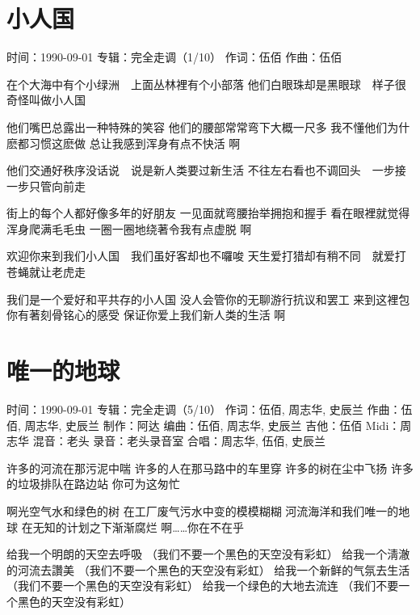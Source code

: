 \documentclass[UTF8,a4paper,oneside,twocolumn,12pt]{ctexbook}
\newcommand{\infopair}[2]{\textbullet #1：#2}
\newcommand{\zc}[1][伍佰]{\infopair{作词}{#1}}
\newcommand{\zq}[1][伍佰]{\infopair{作曲}{#1}}
\newcommand{\bq}[1][伍佰]{\infopair{编曲}{#1}}
\newcommand{\zj}[1]{\infopair{专辑}{#1}}
\newcommand{\zz}[1]{\infopair{制作}{#1}}
\newcommand{\sj}[1]{\infopair{时间}{#1}}
\newenvironment{info}{\begin{flushleft}\kaishu
	}
	{\end{flushleft}\normalsize\yahei\par}
\newenvironment{lyric}{
	}
{}
\begin{document}
\section{小人国}
\begin{info}
	\sj{1990-09-01}
	\zj{完全走调（1/10）}
	\zc
	\zq
\end{info}
\begin{lyric}
	在个大海中有个小绿洲　上面丛林裡有个小部落
	他们白眼珠却是黑眼球　样子很奇怪叫做小人国

	他们嘴巴总露出一种特殊的笑容
	他们的腰部常常弯下大概一尺多
	我不懂他们为什麽都习惯这麽做
	总让我感到浑身有点不快活 啊

	他们交通好秩序没话说　说是新人类要过新生活
	不往左右看也不调回头　一步接一步只管向前走

	街上的每个人都好像多年的好朋友
	一见面就弯腰抬举拥抱和握手
	看在眼裡就觉得浑身爬满毛毛虫
	一圈一圈地绕著令我有点虚脱 啊

	欢迎你来到我们小人国　我们虽好客却也不囉唆
	天生爱打猎却有稍不同　就爱打苍蝇就让老虎走

	我们是一个爱好和平共存的小人国
	没人会管你的无聊游行抗议和罢工
	来到这裡包你有著刻骨铭心的感受
	保证你爱上我们新人类的生活 啊
\end{lyric}

\section{唯一的地球}
\begin{info}
	\sj{1990-09-01}
	\zj{完全走调（5/10）}
	\zc[伍佰, 周志华, 史辰兰]
	\zq[伍佰, 周志华, 史辰兰]
	\zz{阿达}
	\bq[伍佰, 周志华, 史辰兰]
	\infopair{吉他}{伍佰}
	\infopair{Midi}{周志华}
	\infopair{混音}{老头}
	\infopair{录音}{老头录音室}
	\infopair{合唱}{周志华, 伍佰, 史辰兰}
\end{info}
\begin{lyric}
	许多的河流在那污泥中喘
	许多的人在那马路中的车里穿
	许多的树在尘中飞扬
	许多的垃圾排队在路边站
	你可为这匆忙

	啊光空气水和绿色的树
	在工厂废气污水中变的模模糊糊
	河流海洋和我们唯一的地球
	在无知的计划之下渐渐腐烂
	啊……你在不在乎

	给我一个明朗的天空去呼吸 （我们不要一个黑色的天空没有彩虹）
	给我一个淸澈的河流去讚美 （我们不要一个黑色的天空没有彩虹）
	给我一个新鲜的气氛去生活 （我们不要一个黑色的天空没有彩虹）
	给我一个绿色的大地去流连 （我们不要一个黑色的天空没有彩虹）
\end{lyric}
\end{document}
